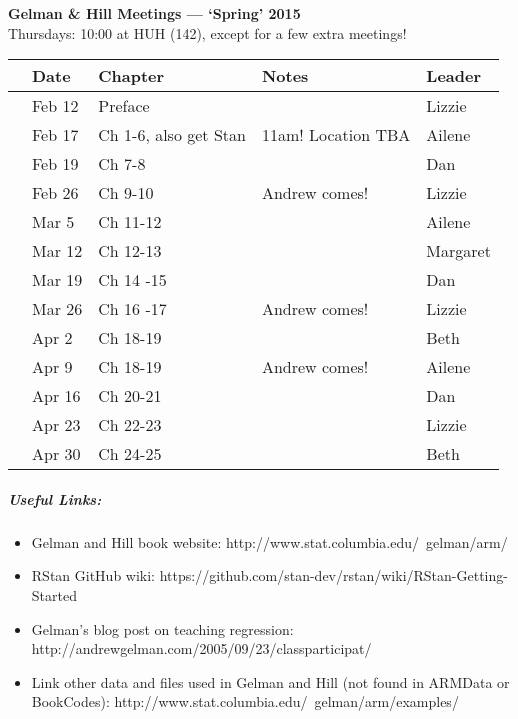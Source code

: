 \documentclass[11pt]{article}
\begin{document}
 
\raggedright
{}

\begin{center} 
{\large \textbf{Gelman \& Hill Meetings --- `Spring' 2015}} \\ [2pt]
Thursdays: 10:00 at HUH (142), except for a few extra meetings!\\
\end{center} 

\begin{center}
\begin{tabular}{ p{0.7 cm}  p{1.5 cm}  p{5 cm}  p{5 cm}  p{1.5 cm} }  \hline \hline
 & \textbf{Date}
   & \textbf{Chapter}
      & \textbf{Notes} 
         & \textbf{Leader} \\ 
\hline \hline
 & Feb 12  &  Preface&        & Lizzie \\\hline
 & Feb 17  & Ch 1-6, also get Stan   &  11am! Location TBA & Ailene  \\\hline
 & Feb 19  & Ch 7-8 &      & Dan \\\hline
 & Feb 26 & Ch 9-10 &  Andrew comes! & Lizzie  \\\hline
 & Mar 5 & Ch 11-12 &        & Ailene   \\\hline
 & Mar 12 & Ch 12-13 &  & Margaret \\\hline
 & Mar 19 & Ch 14 -15 &        & Dan \\\hline
 & Mar 26 & Ch 16 -17 &  Andrew comes! & Lizzie  \\\hline
 & Apr 2& Ch 18-19   &  & Beth  \\\hline
 & Apr 9 & Ch 18-19   &  Andrew comes!& Ailene  \\\hline
 & Apr 16 &Ch 20-21 &  & Dan  \\\hline
 & Apr 23 & Ch 22-23       & & Lizzie \\\hline
 & Apr 30& Ch 24-25  & & Beth\\\hline
\hline
\end{tabular}
\end{center}
\subparagraph{Useful Links:} 
\begin{itemize}
\item Gelman and Hill book website: http://www.stat.columbia.edu/~gelman/arm/
\item RStan GitHub wiki: https://github.com/stan-dev/rstan/wiki/RStan-Getting-Started
\item Gelman's blog post on teaching regression: http://andrewgelman.com/2005/09/23/classparticipat/
\item Link other data and files used in Gelman and Hill (not found in ARMData or BookCodes): http://www.stat.columbia.edu/~gelman/arm/examples/
\end{itemize}
\end{document}
